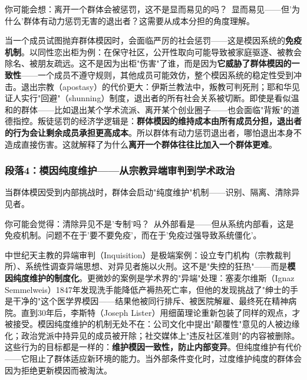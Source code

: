 \documentclass[../main.tex]{subfiles}
\begin{document}
	\begin{tcolorbox}[colback=yellow!5, title=\textit{读者行为预测}]

		你可能会想：离开一个群体会被惩罚，这不是显而易见的吗？\ 显而易见——但'为什么'群体有动力惩罚无害的退出者？这需要从成本分担的角度理解。

	\end{tcolorbox}

当一个成员试图抛弃群体模因时，会面临严厉的社会惩罚——这是模因系统的\textbf{免疫机制}。以同性恋出柜为例：在保守社区，公开性取向可能导致被家庭驱逐、被教会除名、被朋友疏远。这不是因为出柜"伤害"了谁，而是因为\textbf{它威胁了群体模因的一致性}——一个成员不遵守规则，其他成员可能效仿，整个模因系统的稳定性受到冲击。退出宗教（apostasy）的代价更大：伊斯兰教法中，叛教可判死刑；耶和华见证人实行"回避"（shunning）制度，退出者的所有社会关系被切断。即使是看似温和的群体——比如退出某个学术流派、离开某个创业圈子——也会面临"背叛"的道德指控。叛徒惩罚的经济学逻辑是：\textbf{群体模因的维持成本由所有成员分担，退出者的行为会让剩余成员承担更高成本}。所以群体有动力惩罚退出者，哪怕退出本身不造成直接伤害。这就解释了为什么\textbf{离开一个群体往往比加入一个群体更难}。

	\subsubsection*{段落4：模因纯度维护——从宗教异端审判到学术政治}

	当群体模因受到内部挑战时，群体会启动"纯度维护"机制——识别、隔离、清除异见者。

	\begin{tcolorbox}[colback=yellow!5, title=\textit{读者行为预测}]

		你可能会觉得：清除异见不是'专制'吗？\ 从外部看是——但从系统内部看，这是免疫机制。问题不在于'要不要免疫'，而在于'免疫过强导致系统僵化'。

	\end{tcolorbox}

中世纪天主教的异端审判（Inquisition）是极端案例：设立专门机构（宗教裁判所）、系统性调查异端思想、对异见者施以火刑。这不是"失控的狂热"——而是\textbf{模因纯度维护的制度化}。更微妙的案例是学术界的"异端"处理：塞麦尔维斯（Ignaz Semmelweis）1847年发现洗手能降低产褥热死亡率，但他的发现挑战了"绅士的手是干净的"这个医学界模因——结果他被同行排斥、被医院解雇、最终死在精神病院。直到30年后，李斯特（Joseph Lister）用细菌理论重新包装了同样的观点，才被接受。模因纯度维护的机制无处不在：公司文化中提出"颠覆性"意见的人被边缘化；政治党派中持异见的成员被开除；社交媒体上"违反社区准则"的内容被删除。这些行为的目标都是一样的：\textbf{维护模因一致性，防止内部变异}。但纯度维护有代价——它阻止了群体适应新环境的能力。当外部条件变化时，过度维护纯度的群体会因为拒绝更新模因而被淘汰。
\end{document}
